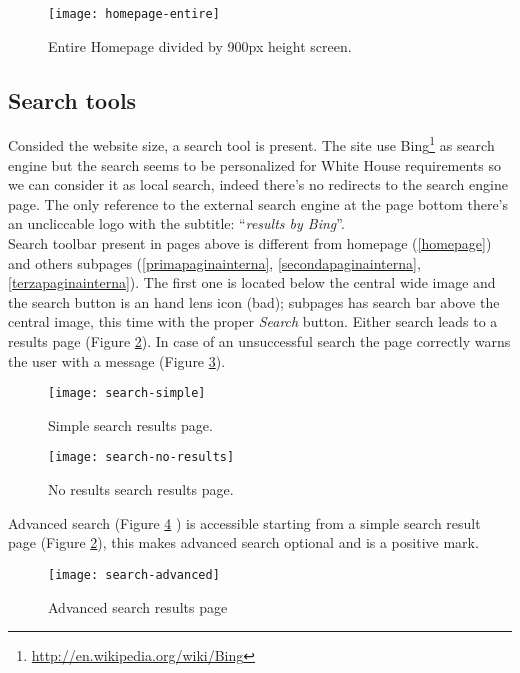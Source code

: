 \documentclass[
10pt, %
a4paper, %
oneside, %
headinclude,footinclude, %
BCOR5mm, %
]{scrartcl}
\begin{document}
	\begin{figure}[h]
	\centering 
	\centerline{\texttt{[image: homepage-entire]}}
	\caption[Entire homepage]{Entire Homepage divided by 900px height screen.}
	\label{fig:entirehomepage} 
	\end{figure}

	\subsection{Search tools}
	Consided the website size, a search tool is present. The site use Bing\footnote{\href{http://en.wikipedia.org/wiki/Bing}{http://en.wikipedia.org/wiki/Bing}} as search engine but the search seems to be personalized for White House requirements so we can consider it as local search, indeed there's no redirects to the search engine page. The only reference to the external search engine at the page bottom there's an uncliccable logo with the subtitle: ``\emph{results by Bing}''. \\
	Search toolbar present in pages above is different from homepage (\ref{homepage}) and others subpages (\ref{primapaginainterna}, \ref{secondapaginainterna}, \ref{terzapaginainterna}). The first one is located below the central wide image and the search button is an hand lens icon (bad); subpages has search bar above the central image, this time with the proper \emph{Search} button. Either search leads to a results page (Figure \ref{fig:search-simple}). In case of an unsuccessful search the page correctly warns the user with a message (Figure \ref{fig:search-no-results}).

	\begin{figure}[h]
	\centering 
	\centerline{\texttt{[image: search-simple]}}
	\caption[Simple search results page]{Simple search results page.}
	\label{fig:search-simple} 
	\end{figure}

	\begin{figure}[h]
	\centering 
	\centerline{\texttt{[image: search-no-results]}}
	\caption[No results search results page]{No results search results page.}
	\label{fig:search-no-results} 
	\end{figure}

	Advanced search (Figure \ref{fig:search-advanced} ) is accessible starting from a simple search result page (Figure \ref{fig:search-simple}), this makes advanced search optional and is a positive mark. 

	\begin{figure}[h]
	\centering 
	\centerline{\texttt{[image: search-advanced]}}
	\caption[Advanced search results page]{Advanced search results page}
	\label{fig:search-advanced} 
	\end{figure}
\end{document}
